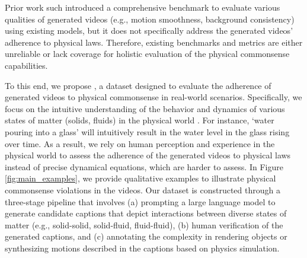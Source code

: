  Prior work such  \cite{huang2023vbench,liu2024evalcrafter} introduced a comprehensive benchmark to evaluate various qualities of generated videos (e.g., motion smoothness, background consistency) using existing models, but it does not specifically address the generated videos' adherence to physical laws. Therefore, existing benchmarks and metrics are either unreliable or lack coverage for holistic evaluation of the physical commonsense capabilities.



To this end, we propose \name{}, a dataset designed to evaluate the adherence of generated videos to physical commonsense in real-world scenarios. Specifically, we focus on the intuitive understanding of the behavior and dynamics of various states of matter (solids, fluids) in the physical world \cite{piloto2022intuitive,yildirim2024perception,bisk2020piqa}. For instance, `water pouring into a glass' will intuitively result in the water level in the glass rising over time. As a result, we rely on human perception and experience in the physical world to assess the adherence of the generated videos to physical laws instead of precise dynamical equations, which are harder to assess. In Figure \ref{fig:main_examples}, we provide qualitative examples to illustrate physical commonsense violations in the videos. Our dataset is constructed through a three-stage pipeline that involves (a) prompting a large language model \cite{gpt4} to generate candidate captions that depict interactions between diverse states of matter (e.g., solid-solid, solid-fluid, fluid-fluid), (b) human verification of the generated captions, and (c) annotating the complexity in rendering objects or synthesizing motions described in the captions based on physics simulation. 



